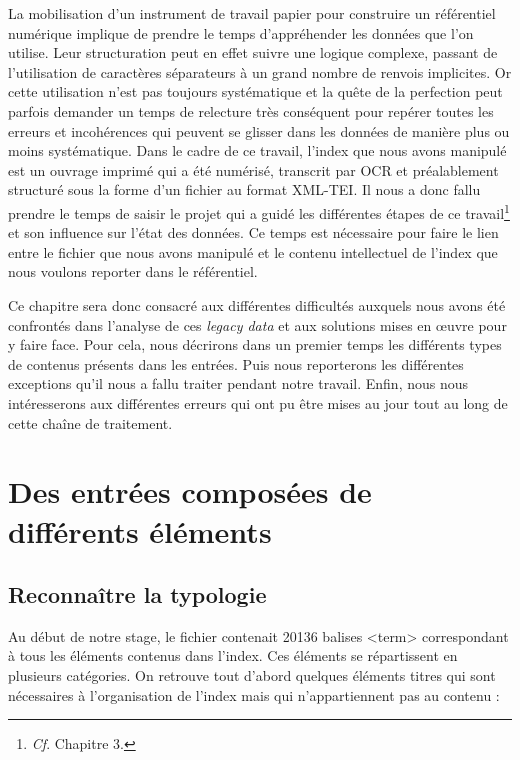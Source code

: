 \documentclass[a4paper,12pt,twoside]{book}
\begin{document}
	La mobilisation d'un instrument de travail papier pour construire un référentiel numérique implique de prendre le temps d'appréhender les données que l'on utilise. Leur structuration peut en effet suivre une logique complexe, passant de l'utilisation de caractères séparateurs à un grand nombre de renvois implicites. Or cette utilisation n'est pas toujours systématique et la quête de la perfection peut parfois demander un temps de relecture très conséquent pour repérer toutes les erreurs et incohérences qui peuvent se glisser dans les données de manière plus ou moins systématique. Dans le cadre de ce travail, l'index que nous avons manipulé est un ouvrage imprimé qui a été numérisé, transcrit par OCR et préalablement structuré sous la forme d'un fichier au format XML-TEI. Il nous a donc fallu prendre le temps de saisir le projet qui a guidé les différentes étapes de ce travail\footnote{\textit{Cf}. Chapitre 3.} et son influence sur l'état des données. Ce temps est nécessaire pour faire le lien entre le fichier que nous avons manipulé et le contenu intellectuel de l'index que nous voulons reporter dans le référentiel.
	
	Ce chapitre sera donc consacré aux différentes difficultés auxquels nous avons été confrontés dans l'analyse de ces \textit{legacy data} et aux solutions mises en œuvre pour y faire face. Pour cela, nous décrirons dans un premier temps les différents types de contenus présents dans les entrées. Puis nous reporterons les différentes exceptions qu'il nous a fallu traiter pendant notre travail. Enfin, nous nous intéresserons aux différentes erreurs qui ont pu être mises au jour tout au long de cette chaîne de traitement.
	
	\section{Des entrées composées de différents éléments}
	
	\subsection{Reconnaître la typologie}
	
	Au début de notre stage, le fichier contenait 20136 balises <term> correspondant à tous les éléments contenus dans l'index. Ces éléments se répartissent en plusieurs catégories. On retrouve tout d'abord quelques éléments titres qui sont nécessaires à l'organisation de l'index mais qui n'appartiennent pas au contenu :
	
\end{document}
